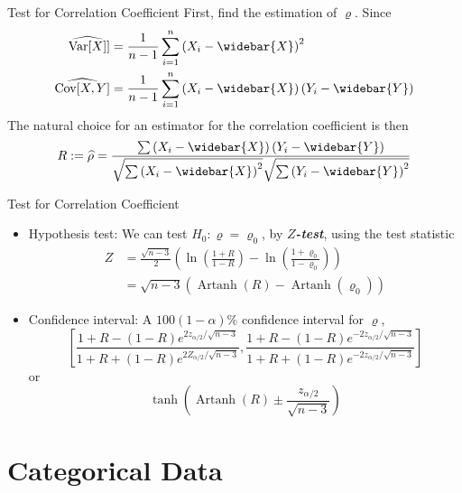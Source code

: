 \documentclass{beamer}
\newcommand{\bb}[1]{\textcolor{antiquefuchsia}{\textbf{\textit{#1}}}}
\begin{document}
\begin{frame}{Test for Correlation Coefficient}
First, find the estimation of $\varrho$. Since
$$
\begin{aligned}
\widehat{\operatorname{Var}[X]}] &=\frac{1}{n-1} \sum_{i=1}^{n}\left(X_{i}-\widebar{X}\right)^{2} \\
\widehat{\operatorname{Cov}[X, Y]} &=\frac{1}{n-1} \sum_{i=1}^{n}\left(X_{i}-\widebar{X}\right)\left(Y_{i}-\widebar{Y}\right)
\end{aligned}
$$
The natural choice for an estimator for the correlation coefficient is then
$$
R:=\widehat{\rho}=\frac{\sum\left(X_{i}-\widebar{X}\right)\left(Y_{i}-\widebar{Y}\right)}{\sqrt{\sum\left(X_{i}-\widebar{X}\right)^{2}} \sqrt{\sum\left(Y_{i}-\widebar{Y}\right)^{2}}}
$$


\end{frame}


\begin{frame}{Test for Correlation Coefficient}
\begin{itemize}
\item Hypothesis test: We can test $H_{0}: \varrho=\varrho_{0}$, by \bb{$Z$-test}, using the test statistic
$$
\begin{aligned}
Z &=\frac{\sqrt{n-3}}{2}\left(\ln \left(\frac{1+R}{1-R}\right)-\ln \left(\frac{1+\varrho_{0}}{1-\varrho_{0}}\right)\right) \\
&=\sqrt{n-3}\left(\operatorname{Artanh}(R)-\operatorname{Artanh}\left(\varrho_{0}\right)\right)
\end{aligned}
$$
\item Confidence interval: A $100(1-\alpha) \%$ confidence interval for $\varrho$,
$$
\left[\frac{1+R-(1-R) e^{2 z_{\alpha / 2} / \sqrt{n-3}}}{1+R+(1-R) e^{2 Z_{\alpha / 2} / \sqrt{n-3}}}, \frac{1+R-(1-R) e^{-2 z_{\alpha / 2} / \sqrt{n-3}}}{1+R+(1-R) e^{-2 z_{\alpha / 2} / \sqrt{n-3}}}\right]
$$
or
$$
\tanh \left(\operatorname{Artanh}(R) \pm \frac{z_{\alpha / 2}}{\sqrt{n-3}}\right)
$$
\end{itemize}

\end{frame}

\section{Categorical Data}
\end{document}
